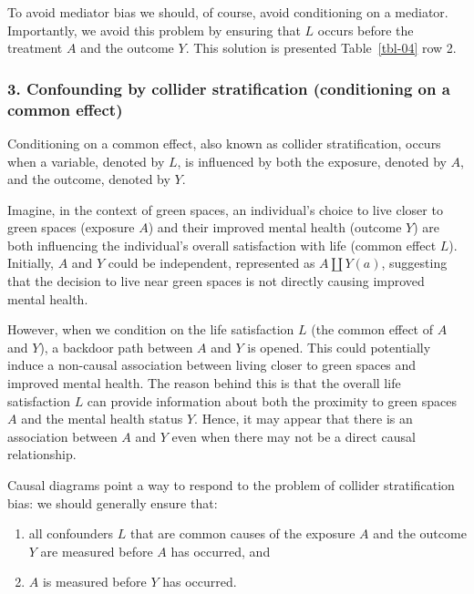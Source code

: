 \documentclass[
  singlecolumn]{article}
\providecommand{\tightlist}{%
  \setlength{\itemsep}{0pt}\setlength{\parskip}{0pt}}\usepackage{longtable,booktabs,array}
\begin{document}
To avoid mediator bias we should, of course, avoid conditioning on a
mediator. Importantly, we avoid this problem by ensuring that \(L\)
occurs before the treatment \(A\) and the outcome \(Y\). This solution
is presented Table~\ref{tbl-04} row 2.

\subsubsection{3. Confounding by collider stratification (conditioning
on a common
effect)}\label{confounding-by-collider-stratification-conditioning-on-a-common-effect}

Conditioning on a common effect, also known as collider stratification,
occurs when a variable, denoted by \(L\), is influenced by both the
exposure, denoted by \(A\), and the outcome, denoted by \(Y\).

Imagine, in the context of green spaces, an individual's choice to live
closer to green spaces (exposure \(A\)) and their improved mental health
(outcome \(Y\)) are both influencing the individual's overall
satisfaction with life (common effect \(L\)). Initially, \(A\) and \(Y\)
could be independent, represented as \(A \coprod Y(a)\), suggesting that
the decision to live near green spaces is not directly causing improved
mental health.

However, when we condition on the life satisfaction \(L\) (the common
effect of \(A\) and \(Y\)), a backdoor path between \(A\) and \(Y\) is
opened. This could potentially induce a non-causal association between
living closer to green spaces and improved mental health. The reason
behind this is that the overall life satisfaction \(L\) can provide
information about both the proximity to green spaces \(A\) and the
mental health status \(Y\). Hence, it may appear that there is an
association between \(A\) and \(Y\) even when there may not be a direct
causal relationship.

Causal diagrams point a way to respond to the problem of collider
stratification bias: we should generally ensure that:

\begin{enumerate}
\def\labelenumi{\arabic{enumi}.}
\tightlist
\item
  all confounders \(L\) that are common causes of the exposure \(A\) and
  the outcome \(Y\) are measured before \(A\) has occurred, and
\item
  \(A\) is measured before \(Y\) has occurred.
\end{enumerate}
\end{document}
